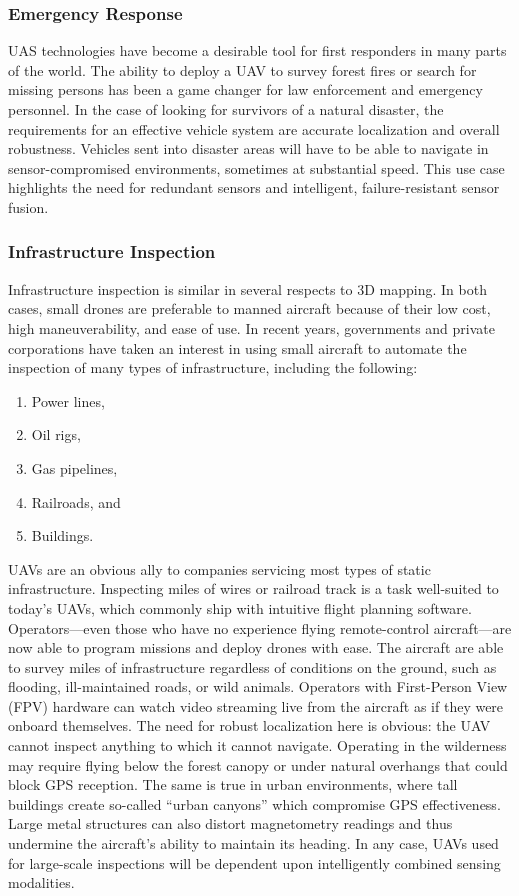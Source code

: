 \subsubsection{Emergency Response}

UAS technologies have become a desirable tool for first responders in many parts of the world. The ability to deploy a UAV to survey forest fires or search for missing persons has been a game changer for law enforcement and emergency personnel. In the case of looking for survivors of a natural disaster, the requirements for an effective vehicle system are accurate localization and overall robustness. Vehicles sent into disaster areas will have to be able to navigate in sensor-compromised environments, sometimes at substantial speed. This use case highlights the need for redundant sensors and intelligent, failure-resistant sensor fusion.

\subsubsection{Infrastructure Inspection}

Infrastructure inspection is similar in several respects to 3D mapping. In both cases, small drones are preferable to manned aircraft because of their low cost, high maneuverability, and ease of use. In recent years, governments and private corporations have taken an interest in using small aircraft to automate the inspection of many types of infrastructure, including the following:
\begin{enumerate}
    \item Power lines,
    \item Oil rigs,
    \item Gas pipelines,
    \item Railroads, and
    \item Buildings.
\end{enumerate}
UAVs are an obvious ally to companies servicing most types of static infrastructure. Inspecting miles of wires or railroad track is a task well-suited to today's UAVs, which commonly ship with intuitive flight planning software. Operators---even those who have no experience flying remote-control aircraft---are now able to program missions and deploy drones with ease. The aircraft are able to survey miles of infrastructure regardless of conditions on the ground, such as flooding, ill-maintained roads, or wild animals. Operators with First-Person View (FPV) hardware can watch video streaming live from the aircraft as if they were onboard themselves. The need for robust localization here is obvious: the UAV cannot inspect anything to which it cannot navigate. Operating in the wilderness may require flying below the forest canopy or under natural overhangs that could block GPS reception. The same is true in urban environments, where tall buildings create so-called ``urban canyons'' which compromise GPS effectiveness. Large metal structures can also distort magnetometry readings and thus undermine the aircraft's ability to maintain its heading. In any case, UAVs used for large-scale inspections will be dependent upon intelligently combined sensing modalities.


